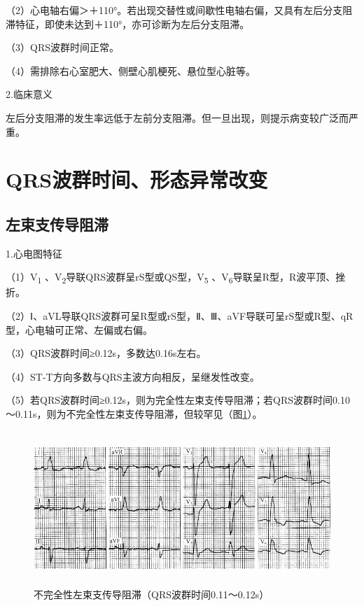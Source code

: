 （2）心电轴右偏＞＋110°。若出现交替性或间歇性电轴右偏，又具有左后分支阻滞特征，即使未达到＋110°，亦可诊断为左后分支阻滞。

（3）QRS波群时间正常。

（4）需排除右心室肥大、侧壁心肌梗死、悬位型心脏等。

2.临床意义

左后分支阻滞的发生率远低于左前分支阻滞。但一旦出现，则提示病变较广泛而严重。

\protect\hypertarget{text00009.htmlux5cux23subid54}{}{}

\section{QRS波群时间、形态异常改变}

\protect\hypertarget{text00009.htmlux5cux23subid55}{}{}

\subsection{左束支传导阻滞}

1.心电图特征

（1）V\textsubscript{1} 、V\textsubscript{2}导联QRS波群呈rS型或QS型，V\textsubscript{5} 、V\textsubscript{6}导联呈R型，R波平顶、挫折。

（2）Ⅰ、aVL导联QRS波群可呈R型或rS型，Ⅱ、Ⅲ、aVF导联可呈rS型或R型、qR型，心电轴可正常、左偏或右偏。

（3）QRS波群时间≥0.12s，多数达0.16s左右。

（4）ST-T方向多数与QRS主波方向相反，呈继发性改变。

（5）若QRS波群时间≥0.12s，则为完全性左束支传导阻滞；若QRS波群时间0.10～0.11s，则为不完全性左束支传导阻滞，但较罕见（图\ref{fig3-12}）。

\begin{figure}[!htbp]
 \centering
 \includegraphics[width=5.58333in,height=2.29167in]{./images/Image00062.jpg}
 \captionsetup{justification=centering}
 \caption{不完全性左束支传导阻滞（QRS波群时间0.11～0.12s）}
 \label{fig3-12}
  \end{figure} 

